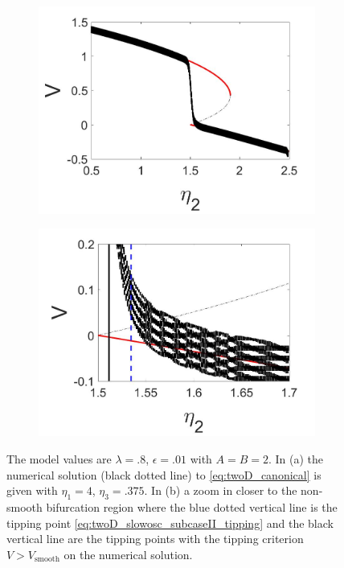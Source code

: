\begin{figure}[H]
\centering
\begin{subfigure}{.5\textwidth}
 \centering
 \includegraphics[width=\linewidth]{twoD/slowosc_bif_diagram_small.jpg}
 \caption{}
\end{subfigure}%
\begin{subfigure}{.5\textwidth}
 \centering
 \includegraphics[width=\linewidth]{twoD/slowosc_bif_diagram_small_zoom.jpg}
 \caption{}
\end{subfigure}
\caption{The model values are $\lambda=.8$, $\epsilon=.01$ with $A=B=2$. In (a) the numerical solution (black dotted line) to \eqref{eq:twoD_canonical} is given with $\eta_1=4$, $\eta_3=.375$. In (b) a zoom in closer to the non-smooth bifurcation region where the blue dotted vertical line is the tipping point \eqref{eq:twoD_slowosc_subcaseII_tipping} and the black vertical line are the tipping points with the tipping criterion $V>V_{\text{smooth}}$ on the numerical solution.}
\label{fig:twoD_slowosc_Vnumerics_small}
\end{figure}

